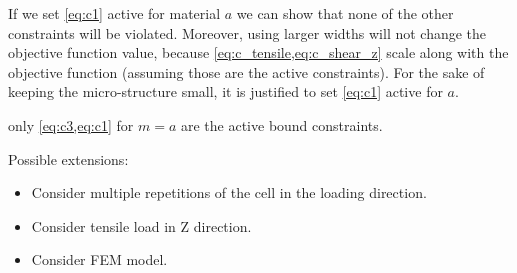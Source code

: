If we set \cref{eq:c1} active for material $a$ we can show that none of the other constraints will be violated.
Moreover, using larger widths will not change the objective function value, because \cref{eq:c_tensile,eq:c_shear_z} scale along with the objective function (assuming those are the active constraints).
For the sake of keeping the micro-structure small, it is justified to set \cref{eq:c1} active for $a$.

 only \cref{eq:c3,eq:c1} for $m=a$ are the active bound constraints.



Possible extensions:
\begin{itemize}
	\item Consider multiple repetitions of the cell in the loading direction.
	\item Consider tensile load in Z direction.
	\item Consider FEM model.
\end{itemize}

